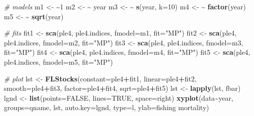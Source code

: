 \documentclass[
]{book}
\newenvironment{Shaded}{\begin{snugshade}}{\end{snugshade}}
\newcommand{\AttributeTok}[1]{\textcolor[rgb]{0.13,0.29,0.53}{#1}}
\newcommand{\CommentTok}[1]{\textcolor[rgb]{0.56,0.35,0.01}{\textit{#1}}}
\newcommand{\ConstantTok}[1]{\textcolor[rgb]{0.56,0.35,0.01}{#1}}
\newcommand{\DecValTok}[1]{\textcolor[rgb]{0.00,0.00,0.81}{#1}}
\newcommand{\ErrorTok}[1]{\textcolor[rgb]{0.64,0.00,0.00}{\textbf{#1}}}
\newcommand{\FunctionTok}[1]{\textcolor[rgb]{0.13,0.29,0.53}{\textbf{#1}}}
\newcommand{\NormalTok}[1]{#1}
\newcommand{\OtherTok}[1]{\textcolor[rgb]{0.56,0.35,0.01}{#1}}
\newcommand{\SpecialCharTok}[1]{\textcolor[rgb]{0.81,0.36,0.00}{\textbf{#1}}}
\newcommand{\StringTok}[1]{\textcolor[rgb]{0.31,0.60,0.02}{#1}}
\begin{document}
\begin{Shaded}
\begin{Highlighting}[]
\CommentTok{\# models}
\NormalTok{m1 }\OtherTok{\textless{}{-}} \ErrorTok{\textasciitilde{}}\DecValTok{1}
\NormalTok{m2 }\OtherTok{\textless{}{-}} \ErrorTok{\textasciitilde{}}\NormalTok{ year}
\NormalTok{m3 }\OtherTok{\textless{}{-}} \ErrorTok{\textasciitilde{}} \FunctionTok{s}\NormalTok{(year, }\AttributeTok{k=}\DecValTok{10}\NormalTok{)}
\NormalTok{m4 }\OtherTok{\textless{}{-}} \ErrorTok{\textasciitilde{}} \FunctionTok{factor}\NormalTok{(year)}
\NormalTok{m5 }\OtherTok{\textless{}{-}} \ErrorTok{\textasciitilde{}} \FunctionTok{sqrt}\NormalTok{(year)}

\CommentTok{\# fits}
\NormalTok{fit1 }\OtherTok{\textless{}{-}} \FunctionTok{sca}\NormalTok{(ple4, ple4.indices, }\AttributeTok{fmodel=}\NormalTok{m1, }\AttributeTok{fit=}\StringTok{"MP"}\NormalTok{)}
\NormalTok{fit2 }\OtherTok{\textless{}{-}} \FunctionTok{sca}\NormalTok{(ple4, ple4.indices, }\AttributeTok{fmodel=}\NormalTok{m2, }\AttributeTok{fit=}\StringTok{"MP"}\NormalTok{)}
\NormalTok{fit3 }\OtherTok{\textless{}{-}} \FunctionTok{sca}\NormalTok{(ple4, ple4.indices, }\AttributeTok{fmodel=}\NormalTok{m3, }\AttributeTok{fit=}\StringTok{"MP"}\NormalTok{)}
\NormalTok{fit4 }\OtherTok{\textless{}{-}} \FunctionTok{sca}\NormalTok{(ple4, ple4.indices, }\AttributeTok{fmodel=}\NormalTok{m4, }\AttributeTok{fit=}\StringTok{"MP"}\NormalTok{)}
\NormalTok{fit5 }\OtherTok{\textless{}{-}} \FunctionTok{sca}\NormalTok{(ple4, ple4.indices, }\AttributeTok{fmodel=}\NormalTok{m5, }\AttributeTok{fit=}\StringTok{"MP"}\NormalTok{)}

\CommentTok{\# plot}
\NormalTok{lst }\OtherTok{\textless{}{-}} \FunctionTok{FLStocks}\NormalTok{(}\AttributeTok{constant=}\NormalTok{ple4}\SpecialCharTok{+}\NormalTok{fit1, }\AttributeTok{linear=}\NormalTok{ple4}\SpecialCharTok{+}\NormalTok{fit2, }\AttributeTok{smooth=}\NormalTok{ple4}\SpecialCharTok{+}\NormalTok{fit3, }\AttributeTok{factor=}\NormalTok{ple4}\SpecialCharTok{+}\NormalTok{fit4, }\AttributeTok{sqrt=}\NormalTok{ple4}\SpecialCharTok{+}\NormalTok{fit5)}
\NormalTok{lst }\OtherTok{\textless{}{-}} \FunctionTok{lapply}\NormalTok{(lst, fbar)}
\NormalTok{lgnd }\OtherTok{\textless{}{-}} \FunctionTok{list}\NormalTok{(}\AttributeTok{points=}\ConstantTok{FALSE}\NormalTok{, }\AttributeTok{lines=}\ConstantTok{TRUE}\NormalTok{, }\AttributeTok{space=}\StringTok{\textquotesingle{}right\textquotesingle{}}\NormalTok{)}
\FunctionTok{xyplot}\NormalTok{(data}\SpecialCharTok{\textasciitilde{}}\NormalTok{year, }\AttributeTok{groups=}\NormalTok{qname, lst, }\AttributeTok{auto.key=}\NormalTok{lgnd, }\AttributeTok{type=}\StringTok{\textquotesingle{}l\textquotesingle{}}\NormalTok{, }\AttributeTok{ylab=}\StringTok{\textquotesingle{}fishing mortality\textquotesingle{}}\NormalTok{)}
\end{Highlighting}
\end{Shaded}
\end{document}
